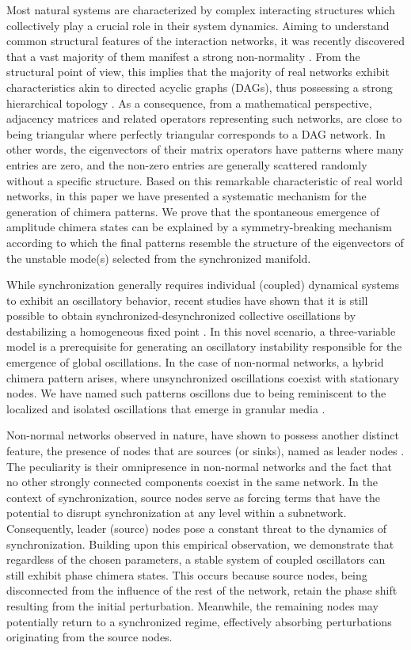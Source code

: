 \documentclass[prx,twocolumn,amsmath,noshowkeys,noshowpacs,amssymb]{revtex4-2}
\begin{document}
Most natural systems are characterized by complex interacting structures which collectively play a crucial role in their system dynamics. Aiming to understand common structural features of the interaction networks, it was recently discovered that a vast majority of them manifest a strong non-normality \cite{asllani2018structure}. From the structural point of view, this implies that the majority of real networks exhibit characteristics akin to directed acyclic graphs (DAGs), thus possessing a strong hierarchical topology \cite{asllani2018structure, OBrien_NN}. As a consequence, from a mathematical perspective, adjacency matrices and related operators representing such networks, are close to being triangular where perfectly triangular corresponds to a DAG network. In other words, the eigenvectors of {their matrix operators} have patterns where many entries are zero, and the non-zero entries are generally scattered randomly without a specific structure. Based on this remarkable characteristic of real world networks, in this paper we have presented a systematic mechanism for the generation of chimera patterns. We prove that the spontaneous emergence of amplitude chimera states can be explained by a symmetry-breaking mechanism according to which the final patterns resemble the structure of the eigenvectors of the unstable mode(s) selected from the synchronized manifold. 

{While synchronization generally requires individual (coupled) dynamical systems to exhibit an oscillatory behavior, recent studies have shown that it is still possible to obtain synchronized-desynchronized collective oscillations by destabilizing a homogeneous fixed point \cite{symm_break}. In this novel scenario, a three-variable model is a prerequisite for generating an oscillatory instability responsible for the emergence of global oscillations. In the case of non-normal networks,} a hybrid chimera pattern arises, where unsynchronized oscillations coexist with stationary nodes. We have named such patterns oscillons due to being reminiscent to the localized and isolated oscillations that emerge in granular media \cite{Vanag_Epstein}.

Non-normal networks observed in nature, have shown to possess another distinct feature, the presence of nodes that are sources (or sinks), named as leader nodes \cite{OBrien_NN}. The peculiarity is their omnipresence in non-normal networks and the fact that no other strongly connected components coexist in the same network. {In the context of synchronization, source nodes serve as forcing terms that have the potential to disrupt synchronization at any level within a subnetwork. Consequently, leader (source) nodes pose a constant threat to the dynamics of synchronization. Building upon this empirical observation, we demonstrate that regardless of the chosen parameters, a stable system of coupled oscillators can still exhibit phase chimera states. This occurs because source nodes, being disconnected from the influence of the rest of the network, retain the phase shift resulting from the initial perturbation. Meanwhile, the remaining nodes may potentially return to a synchronized regime, effectively absorbing perturbations originating from the source nodes.} 
\end{document}
